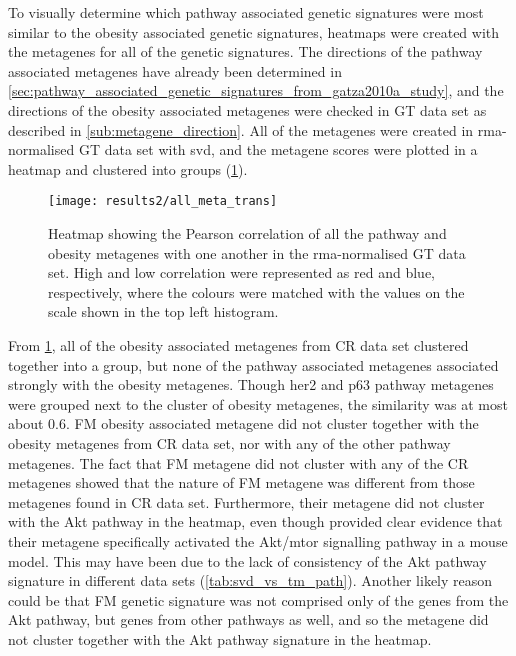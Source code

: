 \noindent
To visually determine which pathway associated genetic signatures were most similar to the obesity associated genetic signatures, heatmaps were created with the metagenes for all of the genetic signatures.
The directions of the pathway associated metagenes have already been determined in \cref{sec:pathway_associated_genetic_signatures_from_gatza2010a_study}, and the directions of the obesity associated metagenes were checked in GT data set as described in \cref{sub:metagene_direction}.
All of the metagenes were created in \gls{rma}-normalised GT data set with \gls{svd}, and the metagene scores were plotted in a heatmap and clustered into groups (\cref{fig:gatza_allmeta}).

\begin{figure}[htpb]
	\centering
	\texttt{[image: results2/all\_meta\_trans]}
	\caption[Heatmap of the Pearson correlation of all the pathway and obesity metagenes with one another in the \acrshort{rma}-normalised GT data]{Heatmap showing the Pearson correlation of all the pathway and obesity metagenes  with one another  in the \gls{rma}-normalised GT data set.
		High and low correlation were represented as red and blue, respectively, where the colours were matched with the values on the scale shown in the top left histogram.}
	\label{fig:gatza_allmeta}
\end{figure}

From \cref{fig:gatza_allmeta}, all of the obesity associated metagenes from CR data set clustered together into a group, but none of the pathway associated metagenes associated strongly with the obesity metagenes.
Though \gls{her2} and p63 pathway metagenes were grouped next to the cluster of obesity metagenes, the similarity was at most about 0.6.
FM obesity associated metagene did not cluster together with the obesity metagenes from CR data set, nor with any of the other pathway metagenes.
The fact that FM metagene did not cluster with any of the CR metagenes showed that the nature of FM metagene was different from those metagenes found in CR data set.
Furthermore, their metagene did not cluster with the Akt pathway in the heatmap, even though \citet{Fuentes-Mattei2014} provided clear evidence that their metagene specifically activated the Akt/\gls{mtor} signalling pathway in a mouse model.
This may have been due to the lack of consistency of the Akt pathway signature in different data sets (\cref{tab:svd_vs_tm_path}).
Another likely reason could be that FM genetic signature was not comprised only of the genes from the Akt pathway, but genes from other pathways as well, and so the metagene did not cluster together with the Akt pathway signature in the heatmap.

